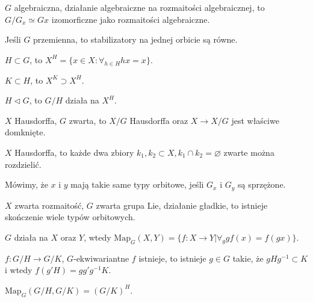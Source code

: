  \begin{twierdzeniebd}
  $G$ algebraiczna, działanie algebraiczne na rozmaitości algebraicznej, to $G/G_x \simeq Gx$ izomorficzne jako rozmaitości algebraiczne.
 \end{twierdzeniebd}
 
 \begin{uwaga}
  Jeśli $G$ przemienna, to stabilizatory na jednej orbicie są równe.
 \end{uwaga}
 
 \begin{definicja}
  $H \subset G$, to $X^H = \{ x\in X: \forall_{h \in H} hx=x \}$.
 \end{definicja}
 
 \begin{uwaga}
  $K \subset H$, to $X^K \supset X^H$.
  
  $H \triangleleft G$, to $G/H$ działa na $X^H$.
 \end{uwaga}
 
 \begin{twierdzenie}
  $X$ Hausdorffa, $G$ zwarta, to $X/G$ Hausdorffa oraz $X \to X/G$ jest właściwe domknięte.
 \end{twierdzenie}
 
 \begin{lemat}
  $X$ Hausdorffa, to każde dwa zbiory $k_1, k_2 \subset X, k_1 \cap k_2 = \varnothing$ zwarte można rozdzielić.
 \end{lemat}
 
 \begin{definicja}
  Mówimy, że $x$ i $y$ mają takie same typy orbitowe, jeśli $G_x$ i $G_y$ są sprzężone.
 \end{definicja}
 
 \begin{twierdzeniebd}
  $X$ zwarta rozmaitość, $G$ zwarta grupa Lie, działanie gładkie, to istnieje skończenie wiele typów orbitowych.
 \end{twierdzeniebd}
 
 \begin{definicja}
  $G$ działa na $X$ oraz $Y$, wtedy $\mathrm{Map}_G(X,Y) = \{ f:X \to Y | \forall_g g f(x) = f(gx) \}$.
 \end{definicja}
 
 \begin{uwaga}
  $f:G/H \to G/K$, $G$-ekwiwariantne $f$ istnieje, to istnieje $g\in G$ takie, że $gHg^{-1} \subset K$ i wtedy $f(g' H) = g g' g^{-1} K$.
 \end{uwaga}
 
 \begin{stwierdzenie}
  $\mathrm{Map}_G(G/H, G/K) = (G/K)^H$.
 \end{stwierdzenie}


















 
 
 
 
